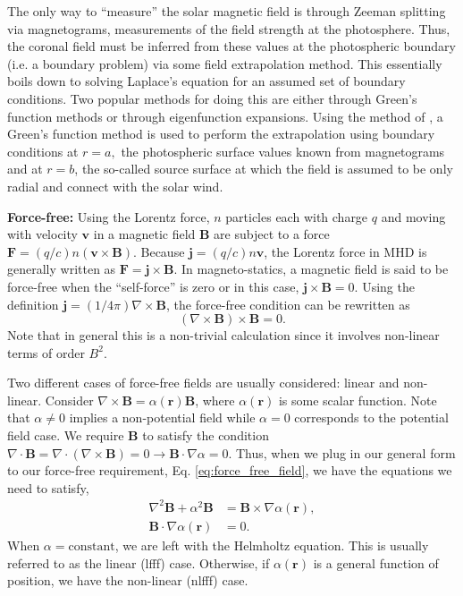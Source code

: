 	The only way to ``measure'' the solar magnetic field is through Zeeman splitting via magnetograms, measurements of the field strength at the photosphere. Thus, the coronal field must be inferred from these values at the photospheric boundary (i.e. a boundary problem) via some field extrapolation method. This essentially boils down to solving Laplace's equation for an assumed set of boundary conditions. Two popular methods for doing this are either through Green's function methods or through eigenfunction expansions. Using the method of \citet{sakurai_greens_1982}, a Green's function method is used to perform the extrapolation using boundary conditions at $r=a,$ the photospheric surface values known from magnetograms and at $r=b$, the so-called source surface at which the field is assumed to be only radial and connect with the solar wind.

	\textbf{Force-free:} Using the Lorentz force, $n$ particles each with charge $q$ and moving with velocity $\mathbf{v}$ in a magnetic field $\mathbf{B}$ are subject to a force $\mathbf{F}=(q/c)n(\mathbf{v}\times\mathbf{B})$. Because $\mathbf{j}=(q/c)n\mathbf{v}$, the Lorentz force in MHD is generally written as $\mathbf{F}=\mathbf{j}\times\mathbf{B}$. In magneto-statics, a magnetic field is said to be force-free when the ``self-force'' is zero or in this case, $\mathbf{j}\times\mathbf{B}=0$. Using the definition $\mathbf{j}=(1/4\pi)\nabla\times\mathbf{B}$, the force-free condition can be rewritten as 
	\begin{equation}
		\label{eq:force_free_field}
		(\nabla\times\mathbf{B})\times\mathbf{B} = 0.
	\end{equation}
	Note that in general this is a non-trivial calculation since it involves non-linear terms of order $B^2$.
	
	Two different cases of force-free fields are usually considered: linear and non-linear. Consider $\nabla\times\mathbf{B}=\alpha(\mathbf{r})\mathbf{B}$, where $\alpha(\mathbf{r})$ is some scalar function. Note that $\alpha\neq0$ implies a non-potential field while $\alpha=0$ corresponds to the potential field case. We require $\mathbf{B}$ to satisfy the condition  $\nabla\cdot\mathbf{B}=\nabla\cdot(\nabla\times\mathbf{B})=0\rightarrow\mathbf{B}\cdot\nabla\alpha=0$. Thus, when we plug in our general form to our force-free requirement, Eq. \ref{eq:force_free_field}, we have the equations we need to satisfy,
	\begin{align}
		\nabla^2\mathbf{B}+\alpha^2\mathbf{B} &= \mathbf{B}\times\nabla\alpha(\mathbf{r}), \\
		\mathbf{B}\cdot\nabla\alpha(\mathbf{r}) &= 0.
	\end{align}
	When $\alpha=\mathrm{constant}$, we are left with the Helmholtz equation. This is usually referred to as the linear (lfff) case. Otherwise, if $\alpha(\mathbf{r})$ is a general function of position, we have the non-linear (nlfff) case.
	
